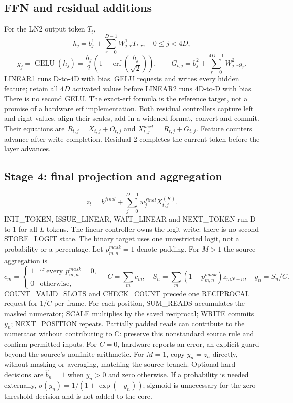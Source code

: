 \subsection{FFN and residual additions}
For the LN2 output token $T_t$,
\[
h_j=b^1_j+\sum_{r=0}^{D-1}W^1_{j,r}T_{t,r},\quad 0\leq j<4D,
\]
\[
g_j=\operatorname{GELU}(h_j)=\frac{h_j}{2}\left(1+\operatorname{erf}\left(\frac{h_j}{\sqrt 2}\right)\right),\qquad
G_{t,j}=b^2_j+\sum_{r=0}^{4D-1}W^2_{j,r}g_r.
\]
LINEAR1 runs D-to-4D with bias. GELU requests and writes every hidden feature; retain all $4D$ activated values before LINEAR2 runs 4D-to-D with bias. There is no second GELU. The exact-erf formula is the reference target, not a promise of a hardware erf implementation.
Both residual controllers capture left and right values, align their scales, add in a widened format, convert and commit. Their equations are $R_{t,j}=X_{t,j}+O_{t,j}$ and $X^{next}_{t,j}=R_{t,j}+G_{t,j}$. Feature counters advance after write completion. Residual 2 completes the current token before the layer advances.

\subsection{Stage 4: final projection and aggregation}
\[
z_t=b^{final}+\sum_{j=0}^{D-1}w^{final}_j X^{(K)}_{t,j}.
\]
INIT\_TOKEN, ISSUE\_LINEAR, WAIT\_LINEAR and NEXT\_TOKEN run D-to-1 for all $L$ tokens. The linear controller owns the logit write: there is no second STORE\_LOGIT state. The binary target uses one unrestricted logit, not a probability or a percentage.
Let $p^{mask}_{m,n}=1$ denote padding. For $M>1$ the source aggregation is
\[
c_m=\begin{cases}1&\text{if every }p^{mask}_{m,n}=0,\\0&\text{otherwise},\end{cases}
\quad C=\sum_m c_m,\quad S_n=\sum_m(1-p^{mask}_{m,n})z_{mN+n},\quad y_n=S_n/C.
\]
COUNT\_VALID\_SLOTS and CHECK\_COUNT precede one RECIPROCAL request for $1/C$ per frame. For each position, SUM\_READS accumulates the masked numerator; SCALE multiplies by the saved reciprocal; WRITE commits $y_n$; NEXT\_POSITION repeats. Partially padded reads can contribute to the numerator without contributing to C: preserve this nonstandard source rule and confirm permitted inputs. For $C=0$, hardware reports an error, an explicit guard beyond the source's nonfinite arithmetic.
For $M=1$, copy $y_n=z_n$ directly, without masking or averaging, matching the source branch. Optional hard decisions are $\hat b_n=1$ when $y_n>0$ and zero otherwise. If a probability is needed externally, $\sigma(y_n)=1/(1+\exp(-y_n))$; sigmoid is unnecessary for the zero-threshold decision and is not added to the core.

